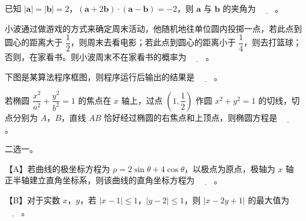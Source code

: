 \begin{question}
已知 $|\boldsymbol a|=|\boldsymbol b|=2$，$(\boldsymbol a+2\boldsymbol b)\cdot(\boldsymbol a-\boldsymbol b)=-2$，则 $\boldsymbol a$ 与 $\boldsymbol b$ 的夹角为 $\underline{\qquad}$。

\end{question}
\begin{question}
小波通过做游戏的方式来确定周末活动，他随机地往单位圆内投掷一点，若此点到圆心的距离大于 $\dfrac12$，则周末去看电影；若此点到圆心的距离小于 $\dfrac14$，则去打篮球；否则，在家看书。则小波周末不在家看书的概率为 $\underline{\qquad}$。

\Needspace{0.4\textheight}
\end{question}
\begin{question}
下图是某算法程序框图，则程序运行后输出的结果是 $\underline{\qquad}$。
\nopagebreak[4]
\begin{center}\end{center}
\nopagebreak[4]
\end{question}
\begin{question}
若椭圆 $\dfrac{x^2}{a^2}+\dfrac{y^2}{b^2}=1$ 的焦点在 $x$ 轴上，过点 $\left(1,\dfrac12\right)$ 作圆 $x^2+y^2=1$ 的切线，切点分别为 $A$，$B$，直线 $AB$ 恰好经过椭圆的右焦点和上顶点，则椭圆方程是 $\underline{\qquad}$。

\end{question}
\begin{question}
二选一。

【A】若曲线的极坐标方程为 $\rho=2\sin\theta+4\cos\theta$，以极点为原点，极轴为 $x$ 轴正半轴建立直角坐标系，则该曲线的直角坐标方程为 $\underline{\qquad}$。

【B】对于实数 $x$，$y$，若 $|x-1|\leqslant1$，$|y-2|\leqslant1$，则 $|x-2y+1|$ 的最大值为 $\underline{\qquad}$。

\end{question}

